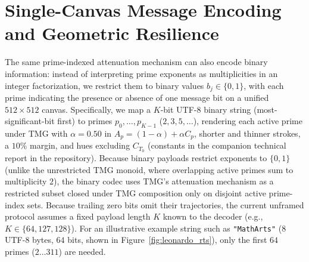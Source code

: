 \documentclass[]{interact}
\theoremstyle{plain}
\theoremstyle{definition}
\theoremstyle{remark}
\begin{document}
\section{Single-Canvas Message Encoding and Geometric Resilience}
\label{sec:codec}
The same prime-indexed attenuation mechanism can also encode binary information: instead of interpreting prime exponents as multiplicities in an integer factorization, we restrict them to binary values $b_j \in \{0, 1\}$, with each prime indicating the presence or absence of one message bit on a unified $512 \times 512$ canvas. Specifically, we map a $K$-bit UTF-8 binary string (most-significant-bit first) to primes $p_0, \dots, p_{K-1}$ ($2, 3, 5, \dots$), rendering each active prime under TMG with $\alpha = 0.50$ in $A_p = (1 - \alpha) + \alpha C_p$, shorter and thinner strokes, a $10\%$ margin, and hues excluding $C_{T_0}$ (constants in the companion technical report in the repository). Because binary payloads restrict exponents to $\{0,1\}$ (unlike the unrestricted TMG monoid, where overlapping active primes sum to multiplicity $2$), the binary codec uses TMG's attenuation mechanism as a restricted subset closed under TMG composition only on disjoint active prime-index sets. Because trailing zero bits omit their trajectories, the current unframed protocol assumes a fixed payload length $K$ known to the decoder (e.g., $K \in \{64, 127, 128\}$). For an illustrative example string such as \texttt{"MathArts"} ($8$ UTF-8 bytes, $64$ bits, shown in Figure~\ref{fig:leonardo_rts}), only the first $64$ primes ($2 \dots 311$) are needed.
\end{document}
